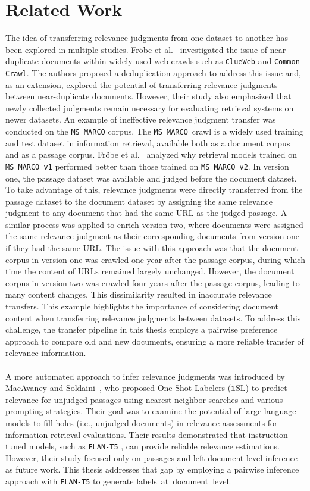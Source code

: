 \chapter{Related Work}\label{related-work}

The idea of transferring relevance judgments from one dataset to another has been explored in multiple studies. Fr\"{o}be et al.~\cite{froebe:2021} investigated the issue of near-duplicate documents within widely-used web crawls such as \texttt{ClueWeb} and \texttt{Common Crawl}. The authors proposed a deduplication approach to address this issue and, as an extension, explored the potential of transferring relevance judgments between near-duplicate documents. However, their study also emphasized that newly collected judgments remain necessary for evaluating retrieval systems on newer datasets. An example of ineffective relevance judgment transfer was conducted on the  \texttt{MS MARCO} corpus. The \mbox{\texttt{MS MARCO} crawl} is a widely used training and test dataset in information retrieval, available both as a document corpus and as a passage corpus. Fr\"{o}be et al.~\cite{froebe:2022} analyzed  why retrieval models trained on \texttt{MS MARCO v1} performed better than those trained on \texttt{MS MARCO  v2}. In version one, the passage dataset was available and judged before the document dataset. To take advantage of this, relevance judgments were directly transferred from the passage dataset to the document dataset by assigning the same relevance judgment to any document that had the same URL as the judged passage. A similar process was applied to enrich version two, where documents were assigned the same relevance judgment as their corresponding documents from version one if they had the same URL. The issue with this approach was that the document corpus in version one was crawled one year after the passage corpus, during which time the content of URLs remained largely unchanged. However, the document corpus in version two was crawled four years after the passage corpus, leading to many content changes. This dissimilarity resulted in inaccurate relevance transfers. This example highlights the importance of considering document content when transferring relevance judgments between datasets. To address this challenge, the transfer pipeline in this thesis employs a pairwise preference approach to compare old and new documents, ensuring a more reliable transfer of relevance information.
\\\\
A more automated approach to infer relevance judgments was introduced by MacAvaney and Soldaini~\cite{macavaney:2023}, who proposed One-Shot Labelers ($\mathbb{1}$SL) to predict relevance for unjudged passages using nearest neighbor searches and various prompting strategies. Their goal was to examine the potential of large language models to fill \glqq holes\grqq{} (i.e., unjudged documents) in relevance assessments for information retrieval evaluations. Their results demonstrated that instruction-tuned models, such as \texttt{FLAN-T5} \cite{chung:2022}, can provide reliable relevance estimations. However, their study focused only on passages and left document level inference as future work. This thesis addresses that gap by employing a pairwise inference approach with \texttt{FLAN-T5} to generate \mbox{labels at document level}.
